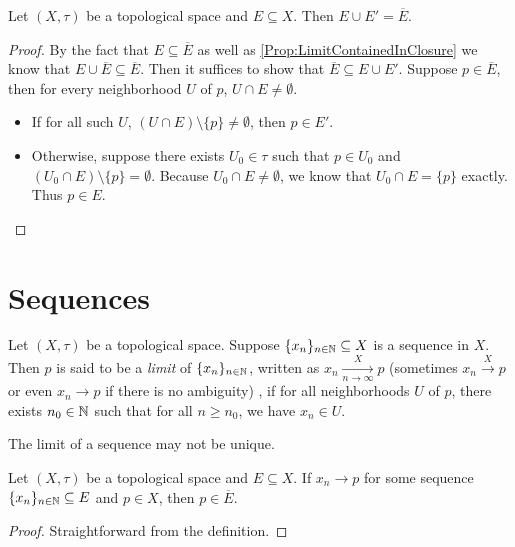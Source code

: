 \documentclass[screen,single]{techreport}
\numberwithin{equation}{section}
\begin{document}
\begin{proposition}\label{Prop:OrigPlusLimitIsClosure}
	Let $(X,\tau)$ be a topological space and $E \subseteq X$.
	Then $E \cup E' = \overline{E}$.
\end{proposition}
\begin{proof}
	By the fact that $E \subseteq \overline{E}$ as well as \cref{Prop:LimitContainedInClosure} we know that $E \cup \overline{E} \subseteq \overline{E}$.
	Then it suffices to show that $\overline{E} \subseteq E \cup E'$.
	Suppose $p \in \overline{E}$, then for every neighborhood $U$ of $p$, $U \cap E \neq \emptyset$.
	\begin{itemize}
		\item If for all such $U$, $(U \cap E) \setminus \{p\} \neq \emptyset$, then $p \in E'$.
		\item Otherwise, suppose there exists $U_0 \in \tau$ such that $p \in U_0$ and $(U_0 \cap E) \setminus \{p\} = \emptyset$. Because $U_0 \cap E \neq \emptyset$, we know that $U_0 \cap E = \{ p\}$ exactly. Thus $p \in E$.
	\end{itemize}
\end{proof}

\section{Sequences}

\begin{definition}\label{De:Sequences}
	Let $(X,\tau)$ be a topological space.
	Suppose $\{x_n\}_{n \in \mathbb{N}} \subseteq X$ is a sequence in $X$.
	Then $p$ is said to be a \emph{limit} of $\{x_n\}_{n \in \mathbb{N}}$, written as $x_n \xrightarrow[n \to \infty]{X} p$ (sometimes $x_n \xrightarrow{X} p$ or even $x_n \rightarrow p$ if there is no ambiguity) , if for all neighborhoods $U$ of $p$, there exists $n_0 \in \mathbb{N}$ such that for all $n \ge n_0$, we have $x_n \in U$.
\end{definition}

\begin{remark}\label{Rem:LimitOfSeqNotUnique}
	The limit of a sequence may not be unique.
\end{remark}

\begin{lemma}\label{Lem:LimitOfSeqInClosure}
	Let $(X,\tau)$ be a topological space and $E \subseteq X$.
	If $x_n \rightarrow p$ for some sequence $\{x_n\}_{n \in \mathbb{N}} \subseteq E$ and $p \in X$, then $p \in \overline{E}$.
\end{lemma}
\begin{proof}
	Straightforward from the definition.
\end{proof}
\end{document}
